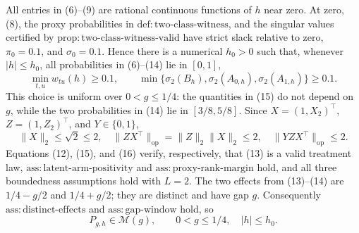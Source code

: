 All entries in (6)--(9) are rational continuous functions of \(h\) near zero.  At zero, (8), the proxy probabilities in \(\mathrm{def:two\text{-}class\text{-}witness}\), and the singular values certified by \(\mathrm{prop:two\text{-}class\text{-}witness\text{-}valid}\) have strict slack relative to zero, \(\pi_0=0.1\), and \(\sigma_0=0.1\).  Hence there is a numerical \(h_0>0\) such that, whenever \(|h|\le h_0\), all probabilities in (6)--(14) lie in \([0,1]\),
\[
 \min_{t,u}w_{tu}(h)\ge0.1,
 \qquad
 \min\{\sigma_2(B_h),\sigma_2(A_{0,h}),\sigma_2(A_{1,h})\}\ge0.1.                \tag{15}
\]
This choice is uniform over \(0<g\le1/4\): the quantities in (15) do not depend on \(g\), while the two probabilities in (14) lie in \([3/8,5/8]\).  Since \(X=(1,X_2)^\top\), \(Z=(1,Z_2)^\top\), and \(Y\in\{0,1\}\),
\[
 \lVert X\rVert_2\le\sqrt2\le2,
 \quad
 \lVert ZX^\top\rVert_{\mathrm{op}}=\lVert Z\rVert_2\lVert X\rVert_2\le2,
 \quad
 \lVert YZX^\top\rVert_{\mathrm{op}}\le2.                                      \tag{16}
\]
Equations (12), (15), and (16) verify, respectively, that (13) is a valid treatment law, \(\mathrm{ass:latent\text{-}arm\text{-}positivity}\) and \(\mathrm{ass:proxy\text{-}rank\text{-}margin}\) hold, and all three boundedness assumptions hold with \(L=2\).  The two effects from (13)--(14) are \(1/4-g/2\) and \(1/4+g/2\); they are distinct and have gap \(g\).  Consequently \(\mathrm{ass:distinct\text{-}effects}\) and \(\mathrm{ass:gap\text{-}window}\) hold, so
\[
 P_{g,h}\in\mathcal M(g),
 \qquad 0<g\le1/4,\quad |h|\le h_0.                                             \tag{17}
\]

